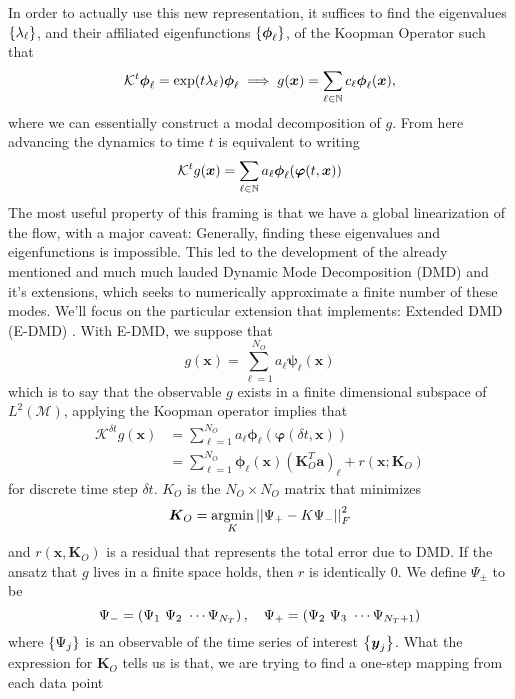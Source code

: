 In order to actually use this new representation, it suffices to find the 
eigenvalues $\left\{\lambda_\ell\right\}$, and their affiliated eigenfunctions 
$\left\{\boldsymbol{\phi}_\ell\right\}$, of the Koopman Operator such that
$$\mathcal{K}^t\boldsymbol{\phi}_\ell = \exp(t\lambda_\ell)\boldsymbol{\phi}
_\ell \implies g(\boldsymbol{x}) = \sum_{\ell \in \mathbb{N}} c_\ell \boldsymbol{\phi}_
\ell(\boldsymbol{x}),$$
where we can essentially construct a modal decomposition of $g$. From here 
advancing the dynamics to time $t$ is equivalent to writing
$$\mathcal{K}^{t} g(\boldsymbol{x}) = \sum_{\ell \in \mathbb{N}} a_\ell \boldsymbol{
  \phi}_\ell (\boldsymbol{\varphi}(t,\boldsymbol{x}))$$
The most useful property of this framing is that we have a global linearization 
of the flow, with a major caveat: Generally, finding these eigenvalues and 
eigenfunctions is impossible. This led to the development of the already 
mentioned and much much lauded Dynamic Mode Decomposition (DMD) and it's 
extensions, which seeks to numerically approximate a finite number of these 
modes. We'll focus on the particular extension that \cite{lago} implements: 
Extended DMD (E-DMD) \cite{williams}. With E-DMD, we suppose that 
$$g(\boldsymbol{x}) = \sum_{\ell = 1}^{N_O} a_\ell \boldsymbol{\psi}_\ell
(\boldsymbol{x})$$
which is to say that the observable $g$ exists in a finite dimensional subspace 
of $L^2(\mathcal{M})$, applying the Koopman operator implies that
\begin{align*} 
    \mathcal{K}^{\delta t} g(\boldsymbol{x}) &= \sum_{\ell = 1}^{N_O} a_\ell 
    \boldsymbol{\phi}_\ell
    (\boldsymbol{\varphi}(\delta t,\boldsymbol{x})) \\
    &= \sum_{\ell = 1}^{N_O} \boldsymbol{\phi}_\ell (\boldsymbol{x})
    (\boldsymbol{K}_O^T
    \boldsymbol{a})_\ell + r(\boldsymbol{x};\boldsymbol{K}_O)
\end{align*}
for discrete time step $\delta t$. $K_O$ is the $N_O\times N_O$ matrix that 
minimizes
$$\boldsymbol{K}_O = \underset{K}{\text{argmin}}\left|\left|\Psi_+ - K\Psi_-\right|\right|_F^2$$
and $r(\boldsymbol{x}, \boldsymbol{K}_O)$ is a residual that represents the 
total error due to DMD. If the ansatz that $g$ lives in a finite space holds, 
then $r$ is identically 0. We define $\Psi_\pm$ to be
$$\Psi_- = \parens{\Psi_1\ \Psi_2\ \cdots \Psi_{N_T}},\quad \Psi_+ = \parens{
  \Psi_2\ \Psi_3\ \cdots \Psi_{N_T+1}}$$
where $\left\{\Psi_j\right\}$ is an observable of the time series of interest 
$\left\{\boldsymbol{y}_j\right\}$. What the expression for $\boldsymbol{K}_O$ tells 
us is that, we are trying to find a one-step mapping from each data point
